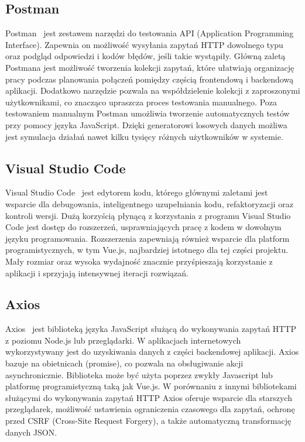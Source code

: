 \subsection{Postman}
Postman~\cite{postman} jest zestawem narzędzi do testowania API (Application Programming Interface). Zapewnia on możliwość wysyłania zapytań HTTP dowolnego typu oraz podgląd odpowiedzi i kodów błędów, jeśli takie wystąpiły. Główną zaletą Postmana jest możliwość tworzenia kolekcji zapytań, które ułatwiają organizację pracy podczas planowania połączeń pomiędzy częścią frontendową i backendową aplikacji. Dodatkowo narzędzie pozwala na współdzielenie kolekcji z zaproszonymi użytkownikami, co znacząco upraszcza proces testowania manualnego. Poza testowaniem manualnym Postman umożliwia tworzenie automatycznych testów przy pomocy języka JavaScript. Dzięki generatorowi losowych danych możliwa jest symulacja działań nawet kilku tysięcy różnych użytkowników w systemie.
\subsection{Visual Studio Code}
Visual Studio Code~\cite{vscode} jest edytorem kodu, którego głównymi zaletami jest wsparcie dla debugowania, inteligentnego uzupełniania kodu, refaktoryzacji oraz kontroli wersji. Dużą korzyścią płynącą z korzystania z programu Visual Studio Code jest dostęp do rozszerzeń, usprawniających pracę z kodem w dowolnym języku programowania. Rozszerzenia zapewniają również wsparcie dla platform programistycznych, w tym Vue.js, najbardziej istotnego dla tej części projektu. Mały rozmiar oraz wysoka wydajność znacznie przyśpieszają korzystanie z aplikacji i sprzyjają intensywnej iteracji rozwiązań.
\subsection{Axios}
Axios~\cite{axios} jest biblioteką języka JavaScript służącą do wykonywania zapytań HTTP z poziomu Node.js lub przeglądarki. W aplikacjach internetowych wykorzystywany jest do uzyskiwania danych z części backendowej aplikacji. Axios bazuje na obietnicach (promise), co pozwala na obsługiwanie akcji asynchronicznie. Biblioteka może być użyta poprzez zwykły Javascript lub platformę programistyczną taką jak Vue.js. W porównaniu z innymi bibliotekami służącymi do wykonywania zapytań HTTP Axios oferuje wsparcie dla starszych przeglądarek, możliwość ustawienia ograniczenia czasowego dla zapytań, ochronę przed CSRF (Cross-Site Request Forgery), a także automatyczną transformację danych JSON.
